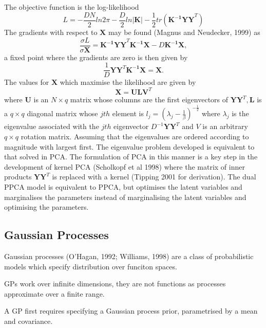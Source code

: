\documentclass[ %
                    author={Dillon Keith Diep},
                supervisor={Dr. Carl Henrik Ek},
                    degree={MEng},
                     title={Assisted Content Generation for 3D Hair Geometry},
                  subtitle={[INCOMPLETE DRAFT, CONTAINS NOTES FROM RESEARCH]},
                      type={Research},
                      year={2014} ]{dissertation}
\begin{document}
The objective function is the log-likelihood
\begin{equation}
	L=-\frac{DN}{2}ln2\pi-\frac{D}{2}ln|\mathbf{K}|-\frac{1}{2}tr(\mathbf{K^{-1}YY}^T)
\end{equation}
The gradients with respect to $\mathbf{X}$ may be found (Magnus and Neudecker, 1999) as
\begin{equation}
	\frac{\sigma L}{\sigma \mathbf{X}}=\mathbf{K^{-1}YY}^T\mathbf{K^{-1}X}-D\mathbf{K^{-1}X},
\end{equation}
a fixed point where the gradients are zero is then given by 
\begin{equation}
	\frac{1}{D}\mathbf{YY}^T\mathbf{K^{-1}X=X}.
\end{equation}
The values for $\mathbf{X}$ which maximise the likelihood are given by 
\begin{equation}
	\mathbf{X=ULV}^T
\end{equation}
where $\mathbf{U}$ is an $N\times q$ matrix whose columns are the first eigenvectors of $\mathbf{YY}^T,\mathbf{L}$ is a $q\times q$ diagonal matrix whose $jth$ element is $l_j=(\lambda_j-\frac{1}{\beta})^{-\frac{1}{2}}$ where $\lambda_j$ is the eigenvalue associated with the $jth$ eigenvector $D^{-1}\mathbf{YY}^T$ and $V$ is an arbitrary $q\times q$ rotation matrix. Assuming that the eigenvalues are ordered according to magnitude with largest first. The eigenvalue problem developed is equivalent to that solved in PCA. %
The formulation of PCA in this manner is a key step in the development of kernel PCA (Scholkopf et al 1998) where the matrix of inner products $\mathbf{YY}^T$ is replaced with a kernel (Tipping 2001 for derivation). The dual PPCA model is equivalent to PPCA, but optimises the latent variables and marginalises the parameters instead of marginalising the latent variables and optimising the parameters.

\subsection{Gaussian Processes}
Gaussian processes (O'Hagan, 1992; Williams, 1998) are a class of probabilistic models which specify distribution over funciton spaces.

GPs work over infinite dimensions, they are not functions as processes approximate over a finite range.

A GP first requires specifying a Gaussian process prior, parametrised by a mean and covariance.
\end{document}
